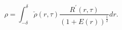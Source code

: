 \begin{equation}
\rho=\int_{-\delta}^\delta
\check{\rho}(r,\tau)\frac{R^{'}(r,\tau)}{\left(1+E(r)\right)^{\frac{1}{2}}}dr.
\end{equation}


